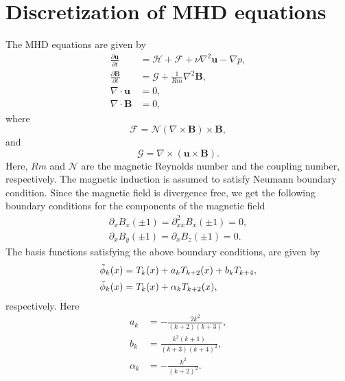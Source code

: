 
\section{Discretization of MHD equations}
\label{sec:discretizationMHD}

The MHD equations are given by
\begin{align}
\frac{\partial \bm{u}}{\partial t} &=  \bm{\mathcal{H}} + \bm{\mathcal{F}} + \nu \nabla^2 \bm{u} - \nabla{p}, 
\label{eq:momentum} \\
\frac{\partial \bm{B}}{\partial t} &= \bm{\mathcal{G}}+ \frac{1}{Rm}\nabla^2 \bm{B}, 
\label{eq:induction} \\
 \nabla \cdot \bm{u} &= 0, \label{eq:divU}\\
  \nabla \cdot \bm{B} &= 0, \label{eq:divB}
\end{align}
where 
\begin{equation}
\bm{\mathcal{F}} = \mathcal{N}(\nabla\times \bm{B})\times \bm{B},
\end{equation}
and
\begin{equation}
\bm{\mathcal{G}} = \nabla\times(\bm{u}\times\bm{B}).
\end{equation}
Here, $Rm$ and $\mathcal{N}$ are the magnetic Reynolds number and the coupling number, respectively. The magnetic induction is assumed to satisfy Neumann boundary condition. Since the magnetic field is divergence free, we get the following boundary conditions for the components of the magnetic field
\begin{align}
\partial_x B_x(\pm 1) = \partial^{2}_{xx} B_x(\pm 1) = 0, \label{NeumannBiharmonicBC}\\
 \partial_x B_y(\pm 1) = \partial_{x} B_z(\pm 1) = 0. \label{NeumannBC}
\end{align}
The basis functions satisfying the above boundary conditions, are given by
\begin{align}
 \tilde{\phi}_k(x) &= T_k(x) + a_k T_{k+2}(x) + 
b_k T_{k+4}, \label{eq:phiNB} \\
\breve{\phi}_k(x) &= T_k(x) +\alpha_k T_{k+2}(x), \label{eq:phiNeumann}
\end{align}
respectively. Here
\begin{align*}
a_k &= - \frac{2k^2}{(k+2)(k+3)},\\
b_k &= \frac{k^2(k+1)}{(k+3)(k+4)^2},\\
\alpha_k &= - \frac{k^2}{(k+2)^2}. 
\end{align*}
